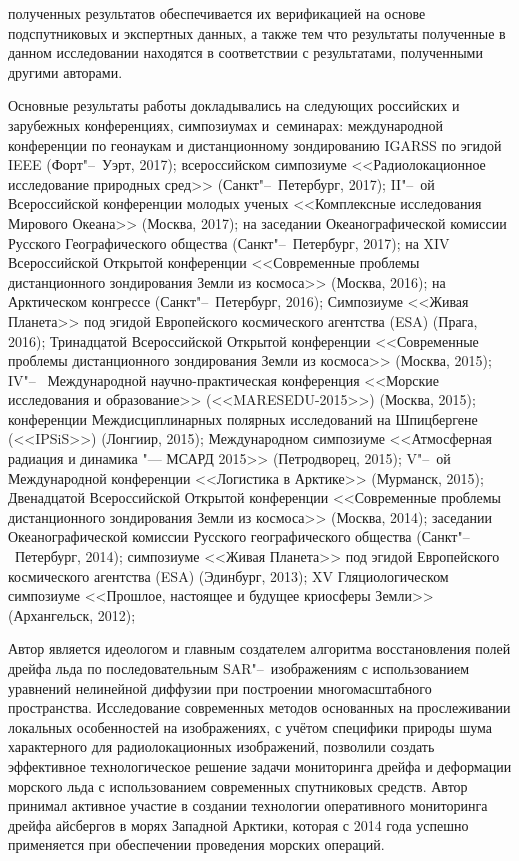 {\reliability} полученных результатов обеспечивается их верификацией на основе подспутниковых и экспертных данных, а также тем что результаты полученные в данном исследовании находятся в соответствии с результатами, полученными другими авторами. 

{\probation}
Основные результаты работы докладывались на следующих российских и зарубежных конференциях, симпозиумах и~семинарах: международной конференции по геонаукам и дистанционному зондированию IGARSS по эгидой IEEE (Форт"--~Уэрт, 2017); всероссийском симпозиуме <<Радиолокационное исследование природных сред>> (Санкт"--~Петербург, 2017); II"--~ой Всероссийской конференции молодых ученых <<Комплексные исследования Мирового Океана>> (Москва, 2017); на заседании Океанографической комиссии Русского Географического общества (Санкт"--~Петербург, 2017); на XIV Всероссийской Открытой конференции <<Современные проблемы дистанционного зондирования Земли из космоса>> (Москва, 2016); на Арктическом конгрессе (Санкт"--~Петербург, 2016); Симпозиуме <<Живая Планета>> под эгидой Европейского космического агентства (ESA) (Прага, 2016); Тринадцатой Всероссийской Открытой конференции <<Современные проблемы дистанционного зондирования Земли из космоса>> (Москва, 2015); IV"--~ Международной научно-практическая конференция <<Морские исследования и образование>> (<<MARESEDU-2015>>) (Москва, 2015); конференции Междисциплинарных полярных исследований на Шпицбергене (<<IPSiS>>) (Лонгиир, 2015); Международном симпозиуме <<Атмосферная радиация и динамика "--- МСАРД 2015>> (Петродворец, 2015); V"--~ой Международной конференции <<Логистика в Арктике>> (Мурманск, 2015); Двенадцатой Всероссийской Открытой конференции <<Современные проблемы дистанционного зондирования Земли из космоса>> (Москва, 2014); заседании Океанографической комиссии Русского географического общества (Санкт"--~Петербург, 2014); симпозиуме <<Живая Планета>> под эгидой Европейского космического агентства (ESA) (Эдинбург, 2013); XV Гляциологическом симпозиуме <<Прошлое, настоящее и будущее криосферы Земли>> (Архангельск, 2012);

{\contribution} Автор является идеологом и главным создателем алгоритма восстановления полей дрейфа льда по последовательным SAR"--~изображениям с использованием уравнений нелинейной диффузии при построении многомасштабного пространства. Исследование современных методов основанных на прослеживании локальных особенностей на изображениях, с учётом специфики природы шума характерного для радиолокационных изображений, позволили создать эффективное технологическое решение задачи мониторинга дрейфа и деформации морского льда с использованием современных спутниковых средств. Автор принимал активное участие в создании технологии оперативного мониторинга дрейфа айсбергов в морях Западной Арктики, которая с 2014 года успешно применяется при обеспечении проведения морских операций.

